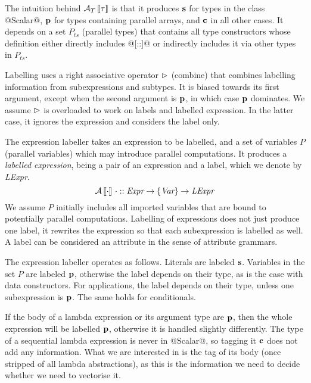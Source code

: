 The intuition behind $\mathcal{A}_T\left\llbracket \tau \right\rrbracket$ is that it produces $\mathbf{s}$ for types in the class @Scalar@, $\mathbf{p}$ for types containing parallel arrays, and $\mathbf{c}$ in all other cases. It depends on a set $P_{ts}$ (parallel types) that contains all type constructors whose definition either directly includes @[::]@ or indirectly includes it via other types in $P_{ts}$.

Labelling uses a right associative operator $\rhd$ (combine) that combines labelling information from subexpressions 
and subtypes. It is biased towards its first argument, except when the second argument is $\mathbf{p}$, in which 
case $\mathbf{p}$ dominates. We assume $\rhd$ is overloaded to work on labels and labelled  expression. In the latter case, it ignores the expression and considers the label only.

The expression labeller takes an expression to be labelled, and a set of variables $P$ (parallel variables) which may introduce parallel computations. It produces a \emph{labelled expression}, being a pair of an expression and a label, which we denote by \textit{LExpr}.
\[
\mathcal{A}\left\llbracket \cdot \right\rrbracket\,\cdot :: \textit{Expr} \to \{\textit{Var}\} \to \textit{LExpr}
\]
We assume $P$ initially includes all imported variables that are bound to potentially parallel computations.  Labelling of expressions does not just produce one label, it rewrites the expression so that each subexpression is labelled as well. A label can be considered an attribute in the sense of attribute grammars.

The expression labeller operates as follows. Literals are labeled $\mathbf{s}$. Variables in the set $P$ are labeled $\mathbf{p}$, otherwise the label depends on their type, as is the case with data constructors. For applications, the label depends on their type, unless one subexpression is $\mathbf{p}$. The same holds for conditionals.

If the body of a lambda expression or its argument type are $\mathbf{p}$, then the whole expression will be labelled $\mathbf{p}$, otherwise it is handled slightly differently. The type of a sequential lambda expression is never in @Scalar@, so tagging it $\mathbf{c}$ does not add any information. What we are interested in is the tag of its body (once stripped of all lambda abstractions), as this is the information we need to decide whether we need to vectorise it.

